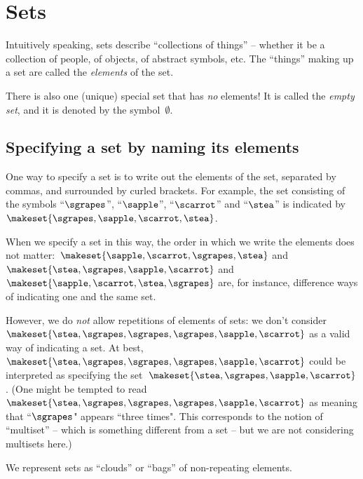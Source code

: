 
\section{Sets}

Intuitively speaking, sets describe ``collections of things'' -- whether it be a collection of people, of objects, of abstract symbols, etc.
The ``things'' making up a set are called the \emph{elements} of the set.

There is also one (unique) special set that has \emph{no} elements!
It is called the \emph{empty set}, and it is denoted by the symbol~$\emptyset$.

\subsection{Specifying a set by naming its elements}

One way to specify a set is to write out the elements of the set, separated by commas, and surrounded by curled brackets.
For example, the set consisting of the symbols ``$\sgrapes$'', ``$\sapple$'', ``$\scarrot$'' and ``$\stea$'' is indicated by~$\makeset{ \sgrapes, \sapple, \scarrot, \stea}$.

When we specify a set in this way, the order in which we write the elements does not matter:~$\makeset{ \sapple, \scarrot, \sgrapes, \stea}$ and~$\makeset{ \stea, \sgrapes, \sapple, \scarrot}$ and~$\makeset{ \sapple, \scarrot, \stea, \sgrapes}$ are, for instance, difference ways of indicating one and the same set.

However, we do \emph{not} allow repetitions of elements of sets: we don't consider~$\makeset{ \stea, \sgrapes, \sgrapes, \sgrapes, \sapple, \scarrot }$ as a valid way of indicating a set.
At best,~$\makeset{ \stea, \sgrapes, \sgrapes, \sgrapes, \sapple, \scarrot }$ could be interpreted as specifying the set~$\makeset{ \stea, \sgrapes, \sapple, \scarrot }$.
(One might be tempted to read $\makeset{ \stea, \sgrapes, \sgrapes, \sgrapes, \sapple, \scarrot }$ as meaning that ``$\sgrapes$" appears ``three times".
This corresponds to the notion of ``multiset'' -- which is something different from a set -- but we are not considering multisets here.)

\begin{marginfigure}
    \centering
    \caption{We represent sets as ``clouds'' or ``bags'' of non-repeating elements.}
    \label{fig:set_as_clouds}
\end{marginfigure}

